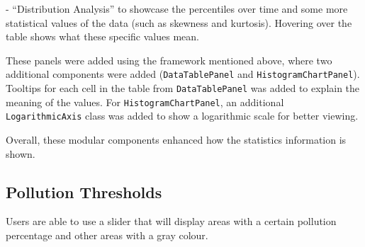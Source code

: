     - “Distribution Analysis” to showcase the percentiles over time and some more statistical values of the data (such as skewness and kurtosis). Hovering over the table shows what these specific values mean.
    
These panels were added using the framework mentioned above, where two additional components were added (\verb|DataTablePanel| and \verb|HistogramChartPanel|). Tooltips for each cell in the table from \verb|DataTablePanel| was added to explain the meaning of the values. For \verb|HistogramChartPanel|, an additional \verb|LogarithmicAxis| class was added to show a logarithmic scale for better viewing.

Overall, these modular components enhanced how the statistics information is shown.

\subsection{Pollution Thresholds}
Users are able to use a slider that will display areas with a certain pollution percentage and other areas with a gray colour.

